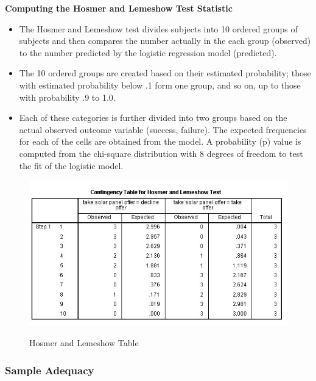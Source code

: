 \documentclass[a4paper,12pt]{article}
\begin{document}

\noindent \textbf{Computing the Hosmer and Lemeshow Test Statistic}

\begin{itemize}
	\item The Hosmer and Lemeshow test
	divides subjects into 10 ordered groups of subjects and then compares the number
	actually in the each group (observed) to the number predicted by the logistic regression
	model (predicted). 
	\item The 10 ordered groups are created based on their estimated probability; those with estimated probability below .1 form one group, and so on, up to those with probability .9 to 1.0.
	\item 
	Each of these categories is further divided into two groups based on the actual observed outcome variable (success, failure). The expected frequencies for each of the cells are obtained from the model. A probability (p) value is
	computed from the chi-square distribution with 8 degrees of freedom to test the fit of the logistic model.
	
\end{itemize}
\begin{figure}[h!]
	\begin{center}
		\includegraphics[scale=0.6]{images/Logistic6}\\
		\caption{Hosmer and Lemeshow Table}
	\end{center}
\end{figure}

\subsubsection{Sample Adequacy}
\end{document}
